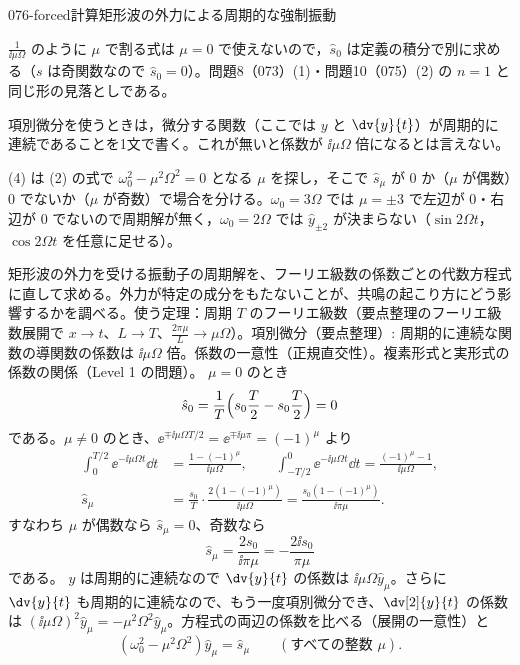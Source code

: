 \documentclass[uplatex,dvipdfmx,a4paper,11pt]{jsarticle}
\begin{document}
\begin{mondai}{076-forced}{計算}{矩形波の外力による周期的な強制振動}
\begin{kizuki}
\item $\frac{1}{\ii\mu\Omega}$ のように $\mu$ で割る式は $\mu=0$ で使えないので，$\hat{s}_0$ は定義の積分で別に求める（$s$ は奇関数なので $\hat{s}_0=0$）。問題8（073）(1)・問題10（075）(2) の $n=1$ と同じ形の見落としである。
\item 項別微分を使うときは，微分する関数（ここでは $y$ と $\dv{y}{t}$）が周期的に連続であることを1文で書く。これが無いと係数が $\ii\mu\Omega$ 倍になるとは言えない。
\item (4) は (2) の式で $\omega_0^{2}-\mu^{2}\Omega^{2}=0$ となる $\mu$ を探し，そこで $\hat{s}_{\mu}$ が 0 か（$\mu$ が偶数）0 でないか（$\mu$ が奇数）で場合を分ける。$\omega_0=3\Omega$ では $\mu=\pm3$ で左辺が 0・右辺が 0 でないので周期解が無く，$\omega_0=2\Omega$ では $\hat{y}_{\pm2}$ が決まらない（$\sin2\Omega t$，$\cos2\Omega t$ を任意に足せる）。
\end{kizuki}
\begin{tadashii}
\houshin 矩形波の外力を受ける振動子の周期解を、フーリエ級数の係数ごとの代数方程式に直して求める。外力が特定の成分をもたないことが、共鳴の起こり方にどう影響するかを調べる。使う定理：周期 $T$ のフーリエ級数（要点整理のフーリエ級数展開で $x\to t$、$L\to T$、$\frac{2\pi\mu}{L}\to\mu\Omega$）。項別微分（要点整理）: 周期的に連続な関数の導関数の係数は $\ii\mu\Omega$ 倍。係数の一意性（正規直交性）。複素形式と実形式の係数の関係（Level 1 の問題）。
\keisan
{} $\mu=0$ のとき
\[
\hat{s}_0=\frac{1}{T}\Bigl(s_0\frac{T}{2}-s_0\frac{T}{2}\Bigr)=0
\]
である。$\mu\neq0$ のとき、$\ee^{\mp\ii\mu\Omega T/2}=\ee^{\mp\ii\mu\pi}=(-1)^{\mu}$ より
\begin{align*}
\int_{0}^{T/2}\ee^{-\ii\mu\Omega t}\dd t&=\frac{1-(-1)^{\mu}}{\ii\mu\Omega},\qquad \int_{-T/2}^{0}\ee^{-\ii\mu\Omega t}\dd t=\frac{(-1)^{\mu}-1}{\ii\mu\Omega},\\
\hat{s}_{\mu}&=\frac{s_0}{T}\cdot\frac{2(1-(-1)^{\mu})}{\ii\mu\Omega}=\frac{s_0(1-(-1)^{\mu})}{\ii\pi\mu}.
\end{align*}
すなわち $\mu$ が偶数なら $\hat{s}_{\mu}=0$、奇数なら
\[
\hat{s}_{\mu}=\frac{2s_0}{\ii\pi\mu}=-\frac{2\ii s_0}{\pi\mu}
\]
である。
 $y$ は周期的に連続なので $\dv{y}{t}$ の係数は $\ii\mu\Omega\hat{y}_{\mu}$。さらに $\dv{y}{t}$ も周期的に連続なので、もう一度項別微分でき、$\dv[2]{y}{t}$ の係数は $(\ii\mu\Omega)^{2}\hat{y}_{\mu}=-\mu^{2}\Omega^{2}\hat{y}_{\mu}$。方程式の両辺の係数を比べる（展開の一意性）と
\[
(\omega_0^{2}-\mu^{2}\Omega^{2})\hat{y}_{\mu}=\hat{s}_{\mu}\qquad(\text{すべての整数 }\mu).
\]
\end{tadashii}
\end{mondai}
\end{document}
